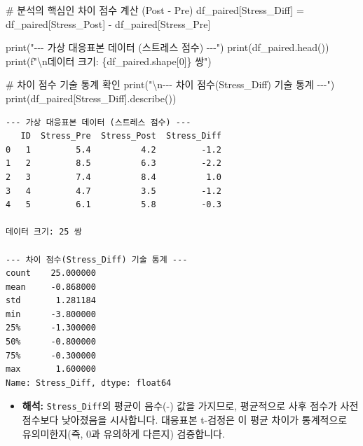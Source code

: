 \documentclass[
  letterpaper,
]{book}
\newenvironment{Shaded}{\begin{snugshade}}{\end{snugshade}}
\newcommand{\BuiltInTok}[1]{\textcolor[rgb]{0.00,0.23,0.31}{#1}}
\newcommand{\CharTok}[1]{\textcolor[rgb]{0.13,0.47,0.30}{#1}}
\newcommand{\CommentTok}[1]{\textcolor[rgb]{0.37,0.37,0.37}{#1}}
\newcommand{\DecValTok}[1]{\textcolor[rgb]{0.68,0.00,0.00}{#1}}
\newcommand{\NormalTok}[1]{\textcolor[rgb]{0.00,0.23,0.31}{#1}}
\newcommand{\OperatorTok}[1]{\textcolor[rgb]{0.37,0.37,0.37}{#1}}
\newcommand{\SpecialCharTok}[1]{\textcolor[rgb]{0.37,0.37,0.37}{#1}}
\newcommand{\SpecialStringTok}[1]{\textcolor[rgb]{0.13,0.47,0.30}{#1}}
\newcommand{\StringTok}[1]{\textcolor[rgb]{0.13,0.47,0.30}{#1}}
\providecommand{\tightlist}{%
  \setlength{\itemsep}{0pt}\setlength{\parskip}{0pt}}
\begin{document}
\begin{Shaded}
\begin{Highlighting}[]
\CommentTok{\# 분석의 핵심인 \textquotesingle{}차이 점수\textquotesingle{} 계산 (Post {-} Pre)}
\NormalTok{df\_paired[}\StringTok{\textquotesingle{}Stress\_Diff\textquotesingle{}}\NormalTok{] }\OperatorTok{=}\NormalTok{ df\_paired[}\StringTok{\textquotesingle{}Stress\_Post\textquotesingle{}}\NormalTok{] }\OperatorTok{{-}}\NormalTok{ df\_paired[}\StringTok{\textquotesingle{}Stress\_Pre\textquotesingle{}}\NormalTok{]}

\BuiltInTok{print}\NormalTok{(}\StringTok{"{-}{-}{-} 가상 대응표본 데이터 (스트레스 점수) {-}{-}{-}"}\NormalTok{)}
\BuiltInTok{print}\NormalTok{(df\_paired.head())}
\BuiltInTok{print}\NormalTok{(}\SpecialStringTok{f"}\CharTok{\textbackslash{}n}\SpecialStringTok{데이터 크기: }\SpecialCharTok{\{}\NormalTok{df\_paired}\SpecialCharTok{.}\NormalTok{shape[}\DecValTok{0}\NormalTok{]}\SpecialCharTok{\}}\SpecialStringTok{ 쌍"}\NormalTok{)}

\CommentTok{\# 차이 점수 기술 통계 확인}
\BuiltInTok{print}\NormalTok{(}\StringTok{"}\CharTok{\textbackslash{}n}\StringTok{{-}{-}{-} 차이 점수(Stress\_Diff) 기술 통계 {-}{-}{-}"}\NormalTok{)}
\BuiltInTok{print}\NormalTok{(df\_paired[}\StringTok{\textquotesingle{}Stress\_Diff\textquotesingle{}}\NormalTok{].describe())}
\end{Highlighting}
\end{Shaded}

\begin{verbatim}
--- 가상 대응표본 데이터 (스트레스 점수) ---
   ID  Stress_Pre  Stress_Post  Stress_Diff
0   1         5.4          4.2         -1.2
1   2         8.5          6.3         -2.2
2   3         7.4          8.4          1.0
3   4         4.7          3.5         -1.2
4   5         6.1          5.8         -0.3

데이터 크기: 25 쌍

--- 차이 점수(Stress_Diff) 기술 통계 ---
count    25.000000
mean     -0.868000
std       1.281184
min      -3.800000
25%      -1.300000
50%      -0.800000
75%      -0.300000
max       1.600000
Name: Stress_Diff, dtype: float64
\end{verbatim}

\begin{itemize}
\tightlist
\item
  \textbf{해석:} \texttt{Stress\_Diff}의 평균이 음수(-) 값을 가지므로,
  평균적으로 사후 점수가 사전 점수보다 낮아졌음을 시사합니다. 대응표본
  t-검정은 이 평균 차이가 통계적으로 유의미한지(즉, 0과 유의하게 다른지)
  검증합니다.
\end{itemize}
\end{document}
